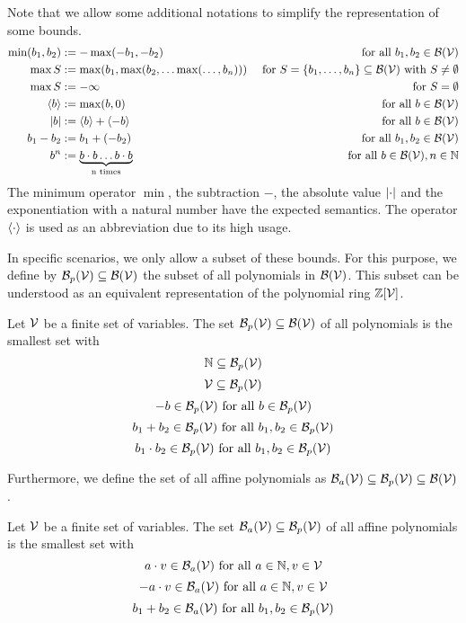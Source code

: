 Note that we allow some additional notations to simplify the representation of some bounds.
\begin{align*}
  \min(b_1,b_2) &:= -\max(-b_1,-b_2) & \text{ for all } b_1, b_2 \in \mathcal{B}(\mathcal{V}) \\
  \max S &:= \max(b_1, \max(b_2, \dots \max(\dots, b_n))) & \text{ for } S = \lbrace b_1, \dots, b_n \rbrace \subseteq \mathcal{B}(\mathcal{V}) \text{ with } S \neq \emptyset \\
  \max S &:= -\infty & \text{ for } S = \emptyset \\
  \langle b\rangle &:= \max(b,0) & \text{ for all } b \in \mathcal{B}(\mathcal{V}) \\
  \left|b\right| &:= \langle b\rangle + \langle-b\rangle & \text{ for all } b \in \mathcal{B}(\mathcal{V}) \\
  b_1 - b_2 &:= b_1 + (-b_2) & \text{ for all } b_1, b_2 \in \mathcal{B}(\mathcal{V}) \\
  b^n &:= \underbrace{b \cdot b \dots b \cdot b}_\text{n times} & \text{ for all } b \in \mathcal{B}(\mathcal{V}), n \in \mathbb{N}
\end{align*}
The minimum operator $\min$, the subtraction $-$, the absolute value $\left|\cdot\right|$ and the exponentiation with a natural number have the expected semantics.
The operator $\langle\cdot\rangle$ is used as an abbreviation due to its high usage.

In specific scenarios, we only allow a subset of these bounds.
For this purpose, we define by $\mathcal{B}_p(\mathcal{V}) \subseteq \mathcal{B}(\mathcal{V})$ the subset of all polynomials in $\mathcal{B}(\mathcal{V})$.
This subset can be understood as an equivalent representation of the polynomial ring $\mathbb{Z}[\mathcal{V}]$.
\begin{definition}
  Let $\mathcal{V}$ be a finite set of variables.
  The set $\mathcal{B}_p(\mathcal{V}) \subseteq \mathcal{B}(\mathcal{V})$ of all polynomials is the smallest set with
  \[ \mathbb{N} \subseteq \mathcal{B}_p(\mathcal{V}) \] 
  \[ \mathcal{V} \subseteq \mathcal{B}_p(\mathcal{V}) \] 
  \[ -b \in \mathcal{B}_p(\mathcal{V}) \text{ for all } b \in \mathcal{B}_p(\mathcal{V}) \] 
  \[ b_1 + b_2 \in \mathcal{B}_p(\mathcal{V}) \text{ for all } b_1, b_2 \in \mathcal{B}_p(\mathcal{V}) \] 
  \[ b_1 \cdot b_2 \in \mathcal{B}_p(\mathcal{V}) \text{ for all } b_1, b_2 \in \mathcal{B}_p(\mathcal{V}) \] 
\end{definition}
Furthermore, we define the set of all affine polynomials as $\mathcal{B}_a(\mathcal{V}) \subseteq \mathcal{B}_p(\mathcal{V}) \subseteq \mathcal{B}(\mathcal{V})$. 
\begin{definition}
  Let $\mathcal{V}$ be a finite set of variables.
  The set $\mathcal{B}_a(\mathcal{V}) \subseteq \mathcal{B}_p(\mathcal{V})$ of all affine polynomials is the smallest set with
  \[ a \cdot v \in \mathcal{B}_a(\mathcal{V}) \text{ for all } a \in \mathbb{N}, v \in \mathcal{V} \] 
  \[ -a \cdot v \in \mathcal{B}_a(\mathcal{V}) \text{ for all } a \in \mathbb{N}, v \in \mathcal{V} \] 
  \[ b_1 + b_2 \in \mathcal{B}_a(\mathcal{V}) \text{ for all } b_1, b_2 \in \mathcal{B}_p(\mathcal{V}) \] 
\end{definition}

